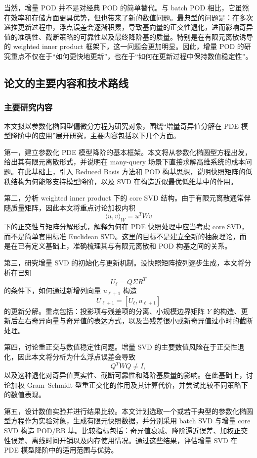 当然，增量 POD 并不是对经典 POD 的简单替代。与 batch POD 相比，它虽然在效率和存储方面更具优势，但也带来了新的数值问题。最典型的问题是：在多次递推更新过程中，浮点误差会逐渐积累，导致基向量的正交性退化，进而影响奇异值的准确性、截断策略的可靠性以及最终降阶基的质量。特别是在有限元离散诱导的 weighted inner product 框架下，这一问题会更加明显。因此，增量 POD 的研究重点不仅在于“如何更快地更新”，也在于“如何在更新过程中保持数值稳定性”。

\subsection{论文的主要内容和技术路线}

\subsubsection{主要研究内容}

本文拟以参数化椭圆型偏微分方程为研究对象，围绕“增量奇异值分解在 PDE 模型降阶中的应用”展开研究，主要内容包括以下几个方面。

第一，建立参数化 PDE 模型降阶的基本框架。本文将从参数化椭圆型方程出发，给出其有限元离散形式，并说明在 many-query 场景下直接求解高维系统的成本问题。在此基础上，引入 Reduced Basis 方法和 POD 构基思想，说明快照矩阵的低秩结构为何能够支持模型降阶，以及 SVD 在构造近似最优低维基中的作用。

第二，分析 weighted inner product 下的 core SVD 结构。由于有限元离散通常伴随质量矩阵，因此本文将重点讨论加权内积
\[
\langle u,v\rangle_W=u^TWv
\]
下的正交性与矩阵分解形式，解释为何在 PDE 快照处理中应当考虑 core SVD，而不是简单套用标准 Euclidean SVD。这里的目标不是建立全新的抽象理论，而是在已有定义基础上，准确梳理其与有限元离散和 POD 构基之间的关系。

第三，研究增量 SVD 的初始化与更新机制。设快照矩阵按列逐步生成，本文将分析在已知
\[
U_\ell = Q\Sigma R^T
\]
的条件下，如何通过新增列向量 $u_{\ell+1}$ 构造
\[
U_{\ell+1}=[U_\ell,u_{\ell+1}]
\]
的更新分解。重点包括：投影项与残差项的分离、小规模边界矩阵 $Y$ 的构造、更新后左右奇异向量与奇异值的表达方式，以及当残差很小或新奇异值过小时的截断处理。

第四，讨论重正交与数值稳定性问题。增量 SVD 的主要数值风险在于正交性退化，因此本文将分析为什么浮点误差会导致
\[
Q^TWQ\neq I,
\]
以及这种退化对奇异值真实性、截断可靠性和降阶基质量的影响。在此基础上，讨论加权 Gram--Schmidt 型重正交化的作用及其计算代价，并尝试比较不同策略下的数值表现。

第五，设计数值实验并进行结果比较。本文计划选取一个或若干典型的参数化椭圆型方程作为实验对象，生成有限元快照数据，并分别采用 batch SVD 与增量 core SVD 构造 POD/RB 基。比较指标包括：奇异值衰减、降阶逼近误差、加权正交性误差、离线时间开销以及内存使用情况。通过这些结果，评估增量 SVD 在 PDE 模型降阶中的适用范围与优势。

